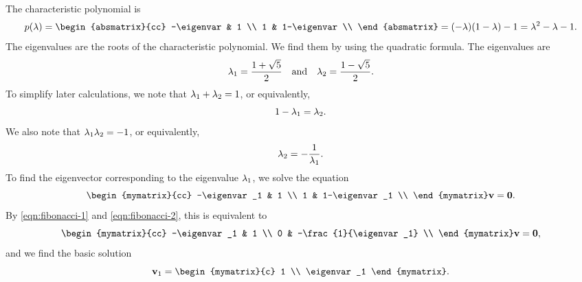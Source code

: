 \begin{solution}
  The characteristic polynomial is
  \begin{equation*}
    p(\eigenvar) =
    \begin{absmatrix}{cc}
      -\eigenvar & 1 \\
      1 & 1-\eigenvar \\
    \end{absmatrix}
    = (-\eigenvar)(1-\eigenvar) - 1
    = \eigenvar^2 - \eigenvar - 1.
  \end{equation*}
  The eigenvalues are the roots of the characteristic polynomial. We
  find them by using the quadratic formula. The eigenvalues are
  \begin{equation*}
    \lambda_1 = \frac{1+\sqrt{5}}{2}
    \quad\mbox{and}\quad
    \lambda_2 = \frac{1-\sqrt{5}}{2}.
  \end{equation*}
  To simplify later calculations, we note that
  $\lambda_1+\lambda_2 = 1$, or equivalently,
  \begin{equation}\label{eqn:fibonacci-1}
    1-\lambda_1 = \lambda_2.
  \end{equation}
  We also note that
  $\lambda_1\lambda_2 = -1$, or equivalently,
  \begin{equation}\label{eqn:fibonacci-2}
    \lambda_2 = -\frac{1}{\lambda_1}.
  \end{equation}
  To find the eigenvector corresponding to the eigenvalue $\lambda_1$,
  we solve the equation
  \begin{equation*}
    \begin{mymatrix}{cc}
      -\eigenvar_1 & 1 \\
      1 & 1-\eigenvar_1 \\
    \end{mymatrix}
    \vect{v} = \vect{0}.
  \end{equation*}
  By {\eqref{eqn:fibonacci-1}} and {\eqref{eqn:fibonacci-2}}, this is
  equivalent to
  \begin{equation*}
    \begin{mymatrix}{cc}
      -\eigenvar_1 & 1 \\
      0 & -\frac{1}{\eigenvar_1} \\
    \end{mymatrix}
    \vect{v} = \vect{0},
  \end{equation*}
  and we find the basic solution
  \begin{equation*}
    \vect{v}_1 = \begin{mymatrix}{c} 1 \\ \eigenvar_1 \end{mymatrix}.

\end{equation*}
\end{solution}
